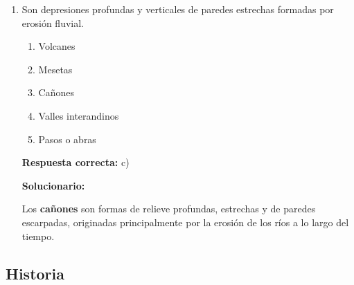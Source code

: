 \begin{enumerate}[resume]
	\vspace{2mm}
	\textbf{Solucionario:}
	
	La \textbf{escala} expresa la proporción entre una distancia en el mapa y su correspondiente distancia real en el terreno. Es un elemento fundamental de la cartografía.
	
	\vspace{6mm}
	
	\item Son depresiones profundas y verticales de paredes estrechas formadas por erosión fluvial.
	\begin{enumerate}[label=\alph*)]
		\item Volcanes
		\item Mesetas
		\item Cañones
		\item Valles interandinos
		\item Pasos o abras
	\end{enumerate}
	\textbf{Respuesta correcta:} c)
	
	\vspace{2mm}
	\textbf{Solucionario:}
	
	Los \textbf{cañones} son formas de relieve profundas, estrechas y de paredes escarpadas, originadas principalmente por la erosión de los ríos a lo largo del tiempo.
	
	\vspace{6mm}
	
\end{enumerate}

\subsection*{Historia}

